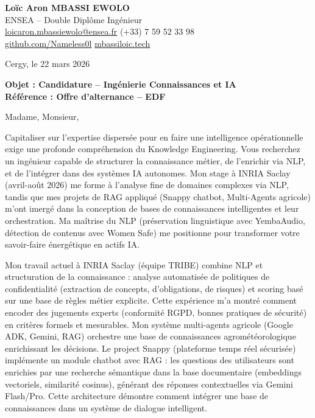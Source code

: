 \documentclass[a4paper,11pt]{article}
\begin{document}
\noindent
\textbf{Loïc Aron MBASSI EWOLO} \\
ENSEA -- Double Diplôme Ingénieur \\
\href{mailto:loicaron.mbassiewolo@ensea.fr}{loicaron.mbassiewolo@ensea.fr} \quad (+33) 7 59 52 33 98 \\
\href{https://github.com/Nameless0l}{github.com/Nameless0l} \quad \href{https://mbassiloic.tech}{mbassiloic.tech}

\vspace{1em}
\noindent Cergy, le 22 mars 2026

\vspace{1em}
\noindent
\textbf{Objet : Candidature -- Ingénierie Connaissances et IA} \\
\textbf{Référence : Offre d'alternance -- EDF}

\vspace{1.5em}
\noindent Madame, Monsieur,

\vspace{0.8em}
Capitaliser sur l'expertise dispersée pour en faire une intelligence opérationnelle exige une profonde compréhension du Knowledge Engineering. Vous recherchez un ingénieur capable de structurer la connaissance métier, de l'enrichir via NLP, et de l'intégrer dans des systèmes IA autonomes. Mon stage à INRIA Saclay (avril-août 2026) me forme à l'analyse fine de domaines complexes via NLP, tandis que mes projets de RAG appliqué (Snappy chatbot, Multi-Agents agricole) m'ont imergé dans la conception de bases de connaissances intelligentes et leur orchestration. Ma maîtrise du NLP (préservation linguistique avec YembaAudio, détection de contenus avec Women Safe) me positionne pour transformer votre savoir-faire énergétique en actifs IA.

\vspace{0.8em}
Mon travail actuel à INRIA Saclay (équipe TRIBE) combine NLP et structuration de la connaissance : analyse automatisée de politiques de confidentialité (extraction de concepts, d'obligations, de risques) et scoring basé sur une base de règles métier explicite. Cette expérience m'a montré comment encoder des jugements experts (conformité RGPD, bonnes pratiques de sécurité) en critères formels et mesurables. Mon système multi-agents agricole (Google ADK, Gemini, RAG) orchestre une base de connaissances agrométéorologique enrichissant les décisions. Le project Snappy (plateforme temps réel sécurisée) implémente un module chatbot avec RAG : les questions des utilisateurs sont enrichies par une recherche sémantique dans la base documentaire (embeddings vectoriels, similarité cosinus), générant des réponses contextuelles via Gemini Flash/Pro. Cette architecture démontre comment intégrer une base de connaissances dans un système de dialogue intelligent.
\end{document}
